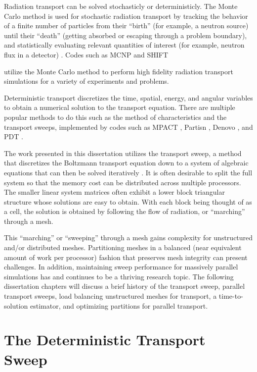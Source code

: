 Radiation transport can be solved stochasticly or deterministicly.
The Monte Carlo method is used for stochastic radiation transport by tracking the behavior of a finite number of particles from their ``birth'' (for example, a neutron source) until their ``death'' (getting absorbed or escaping through a problem boundary), and statistically evaluating relevant quantities of interest (for example, neutron flux in a detector) \cite{shultis_mc}.
Codes such as MCNP \cite{MCNP} and SHIFT {\cite{shift} utilize the Monte Carlo method to perform high fidelity radiation transport simulations for a variety of experiments and problems. 

Deterministic transport discretizes the time, spatial, energy, and angular variables to obtain a numerical solution to the transport equation.
There are multiple popular methods to do this such as the method of characteristics and the transport sweeps, implemented by codes such as MPACT \cite{mpact}, Partisn \cite{partisn}, Denovo \cite{denovo}, and PDT \cite{mpadams2013,mpadams2015}. 

The work presented in this dissertation utilizes the transport sweep, a method that discretizes the Boltzmann transport equation \cite{bell_glasstone,zweifel,davison,duderstadt} down to a system of algebraic equations that can then be solved iteratively \cite{adams_larsen}.
It is often desirable to split the full system so that the memory cost can be distributed across multiple processors. 
The smaller linear system matrices often exhibit a lower block triangular structure whose solutions are easy to obtain.
With each block being thought of as a cell, the solution is obtained by following the flow of radiation, or ``marching'' through a mesh.

This ``marching'' or ``sweeping'' through a mesh gains complexity for unstructured and/or distributed meshes. Partitioning meshes in a balanced (near equivalent amount of work per processor) fashion that preserves mesh integrity can present challenges.
In addition, maintaining sweep performance for massively parallel simulations has and continues to be a thriving research topic.
The following dissertation chapters will discuss a brief history of the transport sweep, parallel transport sweeps, load balancing unstructured meshes for transport, a time-to-solution estimator, and optimizing partitions for parallel transport. 

\section*{The Deterministic Transport Sweep}

}
